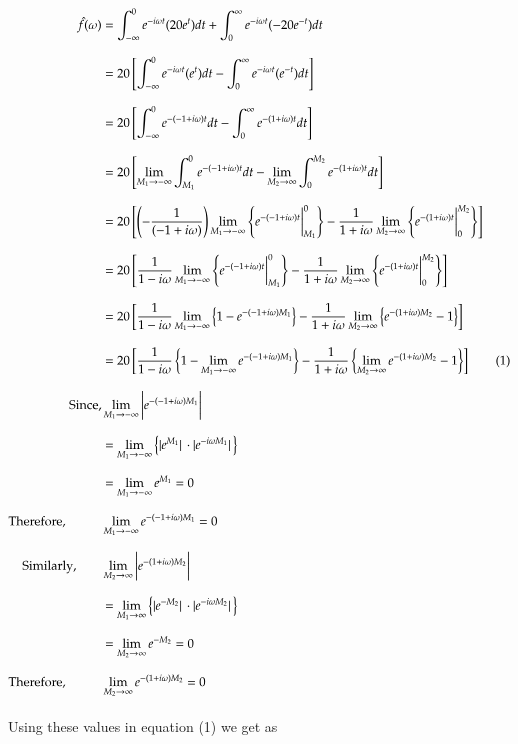 \documentclass[12pt, a4paper]{article} %
\begin{document}
\begin{equation*}
    \begin{split}
        \hat{f}(\omega) & = \int_{-\infty}^{0}e^{-i\omega t} (20e^t)dt + \int_{0}^{\infty}e^{-i\omega t} (-20e^{-t})dt\\[3mm]
        & = 20\left[\int_{-\infty}^{0}e^{-i\omega t} (e^t)dt - \int_{0}^{\infty}e^{-i\omega t} (e^{-t})dt\right]\\[3mm]
        & = 20\left[\int_{-\infty}^{0}e^{-(-1+i\omega)t}dt - \int_{0}^{\infty}e^{-(1+i\omega)t}dt\right]\\[3mm]
        & = 20\left[\lim_{M_1\to -\infty}\int_{M_1}^{0}e^{-(-1+i\omega)t}dt - \lim_{M_2\to \infty}\int_{0}^{M_2}e^{-(1+i\omega)t}dt\right]\\[3mm]
        & = 20\left[\left(-\frac{1}{(-1+i\omega)}\right)\lim_{M_1\to -\infty}\left\{e^{-(-1+i\omega)t}\bigg|_{M_1}^{0}\right\}-\frac{1}{1+i\omega}\lim_{M_2\to\infty}\left\{e^{-(1+i\omega)t}\bigg|_{0}^{M_2}\right\}\right]\\[3mm]
        & = 20\left[\frac{1}{1-i\omega}\lim_{M_1\to -\infty}\left\{e^{-(-1+i\omega)t}\bigg|_{M_1}^{0}\right\}-\frac{1}{1+i\omega}\lim_{M_2\to\infty}\left\{e^{-(1+i\omega)t}\bigg|_{0}^{M_2}\right\}\right]\\[3mm]
        & = 20\left[\frac{1}{1-i\omega}\lim_{M_1\to -\infty}\left\{1 - e^{-(-1+i\omega)M_1}\right\}-\frac{1}{1+i\omega}\lim_{M_2\to\infty}\left\{e^{-(1+i\omega)M_2}- 1\right\}\right]\\[3mm]
        & = 20\left[\frac{1}{1-i\omega}\left\{1 - \lim_{M_1\to -\infty}e^{-(-1+i\omega)M_1}\right\}-\frac{1}{1+i\omega}\left\{\lim_{M_2\to\infty}e^{-(1+i\omega)M_2}- 1\right\}\right] \hspace*{0.7cm}(1)\\[3mm]
        \mbox{Since}, & \lim_{M_1\to -\infty}\bigg|e^{-(-1 + i\omega)M_1}\bigg|\\[3mm]
        & =  \lim_{M_1\to -\infty}\left\{\abs*{e^{M_1}}\cdot\abs*{e^{-i\omega M_1}}\right\}\\[3mm]
        & = \lim_{M_1\to -\infty}e^{M_1} = 0\\[3mm]
        \mbox{Therefore}, \hspace*{1cm} & \lim_{M_1\to-\infty}e^{-(-1+i\omega)M_1} = 0\\[3mm]
        \mbox{Similarly},\hspace*{0.7cm} & \lim_{M_2\to \infty}\bigg|e^{-(1 + i\omega)M_2}\bigg|\\[3mm]
        & =  \lim_{M_1\to \infty}\left\{\abs*{e^{-M_2}}\cdot\abs*{e^{-i\omega M_2}}\right\}\\[3mm]
        & = \lim_{M_2\to \infty}e^{-M_2} = 0\\[3mm]
        \mbox{Therefore}, \hspace*{1cm} & \lim_{M_2\to \infty}e^{-(1+i\omega)M_2} = 0\\[3mm]
    \end{split}
\end{equation*}
\BgThispage
Using these values in equation (1) we get as
\end{document}

